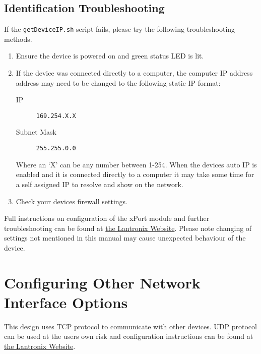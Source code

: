 \subsection{Identification Troubleshooting} %
\label{sub:identification_troubleshooting}
If the \texttt{getDeviceIP.sh} script fails, please try the following troubleshooting methods.
\begin{enumerate}
	\item Ensure the device is powered on and green status LED is lit.
	\item If the device was connected directly to a computer, the computer IP address address may need to be changed to the following static IP format:
	\begin{description}
		\item[IP] \texttt{169.254.X.X}
		\item[Subnet Mask] \texttt{255.255.0.0}  
	\end{description}
	Where an `X' can be any number between 1-254.
	When the devices auto IP is enabled and it is connected directly to a computer it may take some time for a self assigned IP to resolve and show on the network.
	\item Check your devices firewall settings.
\end{enumerate}

Full instructions on configuration of the xPort module and further troubleshooting can be found at \href{https://www.lantronix.com/products/xport/}{the Lantronix Website}. Please note changing of settings not mentioned in this manual may cause unexpected behaviour of the device.


\section{Configuring Other Network Interface Options} %
\label{sec:configuring_other_network_interface_options}
This design uses TCP protocol to communicate with other devices. UDP protocol can be used at the users own risk and configuration instructions can be found at \href{https://www.lantronix.com/products/xport/}{the Lantronix Website}.
